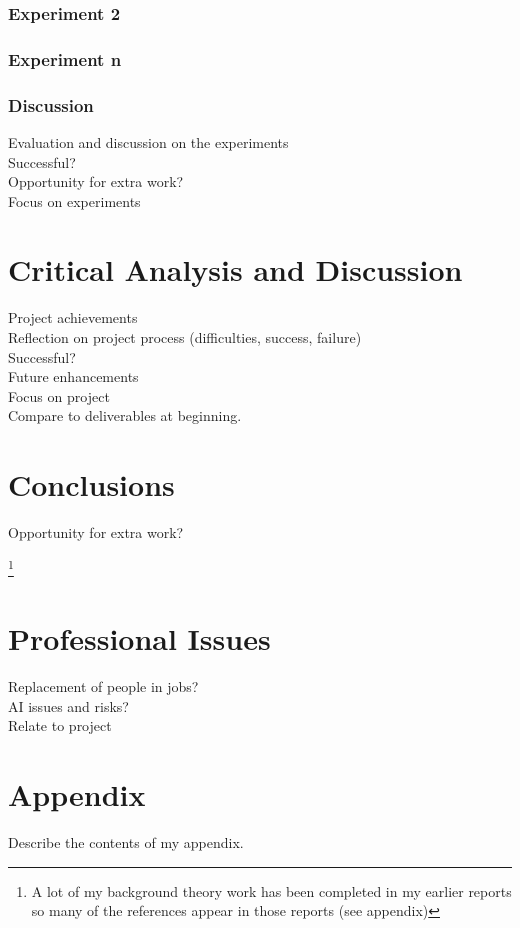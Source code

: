 \documentclass[]{final_report}
\begin{document}
\subsection{Experiment 2}

\subsection{Experiment n}

\subsection{Discussion}
Evaluation and discussion on the experiments\\
Successful?\\
Opportunity for extra work?\\
Focus on experiments

\chapter{Critical Analysis and Discussion}
Project achievements\\
Reflection on project process (difficulties, success, failure)\\
Successful?\\
Future enhancements\\
Focus on project\\
Compare to deliverables at beginning.

\chapter{Conclusions}
Opportunity for extra work?

\newpage
{}

\footnote{A lot of my background theory work has been completed in my earlier reports so many of the references appear in those reports (see appendix)}
\label{endpage}

\chapter{Professional Issues}
Replacement of people in jobs?\\
AI issues and risks?\\
Relate to project

\chapter{Appendix}
\label{appendix}
Describe the contents of my appendix.







\begin{figure}
	
	\caption{\label{appendix:web_app_testing}}
	
\end{figure}
\end{document}
